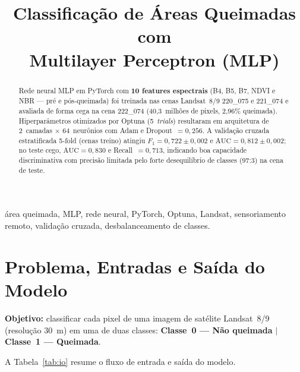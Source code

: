 \documentclass[conference]{IEEEtran}
\begin{document}
\title{Classificação de Áreas Queimadas com\\
Multilayer Perceptron (MLP)}

\author{
}

\maketitle

\begin{abstract}
Rede neural MLP em PyTorch com \textbf{10 features espectrais} (B4, B5, B7,
NDVI e NBR — pré e pós-queimada) foi treinada nas cenas Landsat~8/9
220\_075 e 221\_074 e avaliada de forma cega na cena 222\_074 (40,3~milhões
de pixels, 2,96\% queimada). Hiperparâmetros otimizados por Optuna
(5~\textit{trials}) resultaram em arquitetura de 2~camadas $\times$ 64~neurônios
com Adam e Dropout~$= 0{,}256$. A validação cruzada estratificada 5-fold
(cenas treino) atingiu $F_1 = 0{,}722 \pm 0{,}002$ e
$\mathrm{AUC} = 0{,}812 \pm 0{,}002$; no teste cego,
$\mathrm{AUC} = 0{,}830$ e Recall~$= 0{,}713$, indicando boa capacidade
discriminativa com precisão limitada pelo forte desequilíbrio de classes (97:3)
na cena de teste.
\end{abstract}

\begin{IEEEkeywords}
área queimada, MLP, rede neural, PyTorch, Optuna, Landsat, sensoriamento
remoto, validação cruzada, desbalanceamento de classes.
\end{IEEEkeywords}

\section{Problema, Entradas e Saída do Modelo}

\textbf{Objetivo:} classificar cada pixel de uma imagem de satélite Landsat~8/9
(resolução 30~m) em uma de duas classes: \textbf{Classe~0 — Não queimada}
$|$ \textbf{Classe~1 — Queimada}.

A Tabela~\ref{tab:io} resume o fluxo de entrada e saída do modelo.
\end{document}
